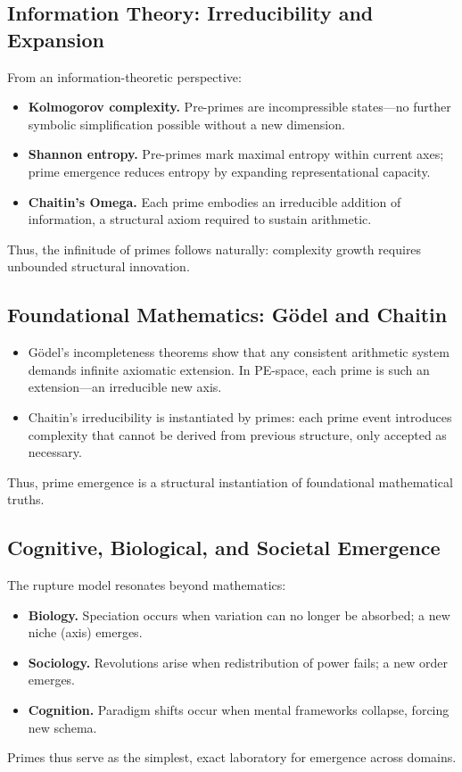 \documentclass[11pt]{article}
\theoremstyle{plain}
\theoremstyle{definition}
\begin{document}
\subsection{Information Theory: Irreducibility and Expansion}
From an information-theoretic perspective:
\begin{itemize}
  \item \textbf{Kolmogorov complexity.} Pre-primes are incompressible states—no further symbolic simplification possible without a new dimension.  
  \item \textbf{Shannon entropy.} Pre-primes mark maximal entropy within current axes; prime emergence reduces entropy by expanding representational capacity.  
  \item \textbf{Chaitin’s Omega.} Each prime embodies an irreducible addition of information, a structural axiom required to sustain arithmetic.  
\end{itemize}
Thus, the infinitude of primes follows naturally: complexity growth requires unbounded structural innovation.

\subsection{Foundational Mathematics: Gödel and Chaitin}
\begin{itemize}
  \item Gödel’s incompleteness theorems show that any consistent arithmetic system demands infinite axiomatic extension. In PE-space, each prime is such an extension—an irreducible new axis.  
  \item Chaitin’s irreducibility is instantiated by primes: each prime event introduces complexity that cannot be derived from previous structure, only accepted as necessary.  
\end{itemize}
Thus, prime emergence is a structural instantiation of foundational mathematical truths.

\subsection{Cognitive, Biological, and Societal Emergence}
The rupture model resonates beyond mathematics:
\begin{itemize}
  \item \textbf{Biology.} Speciation occurs when variation can no longer be absorbed; a new niche (axis) emerges.  
  \item \textbf{Sociology.} Revolutions arise when redistribution of power fails; a new order emerges.  
  \item \textbf{Cognition.} Paradigm shifts occur when mental frameworks collapse, forcing new schema.  
\end{itemize}
Primes thus serve as the simplest, exact laboratory for emergence across domains.
\end{document}
